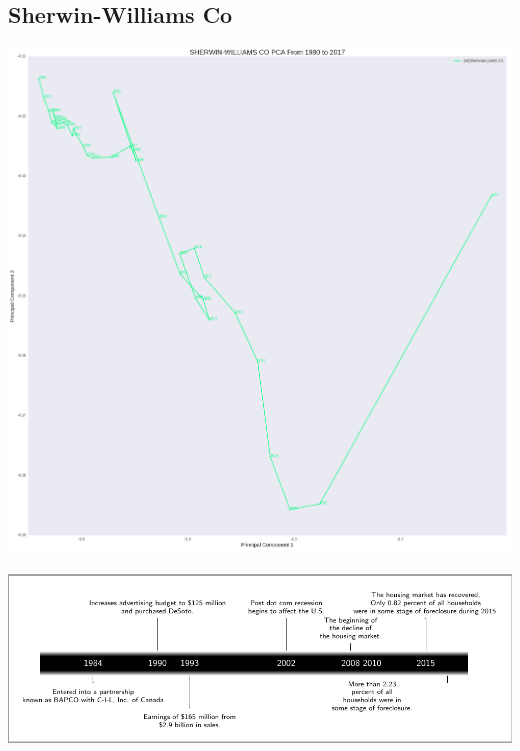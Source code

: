 \subsection{Sherwin-Williams Co}
\includegraphics[width=1\textwidth]{./Sherwin_Williams}\\[0.1in] \\
\includegraphics[width=1\textwidth]{./Sherwin_Williamstimeline}\\[0.1in] \\

